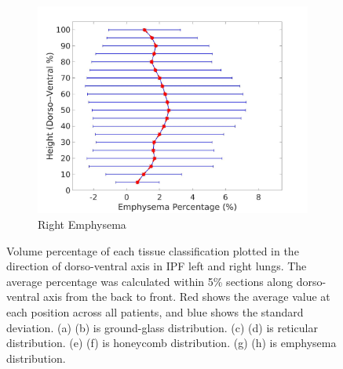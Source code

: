 \begin{figure}[H]
\begin{subfigure}{.42\linewidth}
  \includegraphics[width=\linewidth,trim={{.0\wd0} {.0\wd0} {.0\wd0} {.0\wd0}},clip]{QuantitativeAnalysis/Image/RightLungEmphysemaDiseaseDorsoToVentral.jpg}
  \caption{Right Emphysema}
  \label{fig:DiseaseDorsoToVentral-h}
\end{subfigure}
\caption{Volume percentage of each tissue classification plotted in the direction of dorso-ventral axis in IPF left and right lungs. The average percentage was calculated within 5\% sections along dorso-ventral axis from the back to front. Red shows the average value at each position across all patients, and blue shows the standard deviation. (a) (b) is ground-glass distribution. (c) (d) is reticular distribution. (e) (f) is honeycomb distribution. (g) (h) is emphysema distribution.}
\label{fig:DiseaseDorsoToVentral}
\end{figure}

